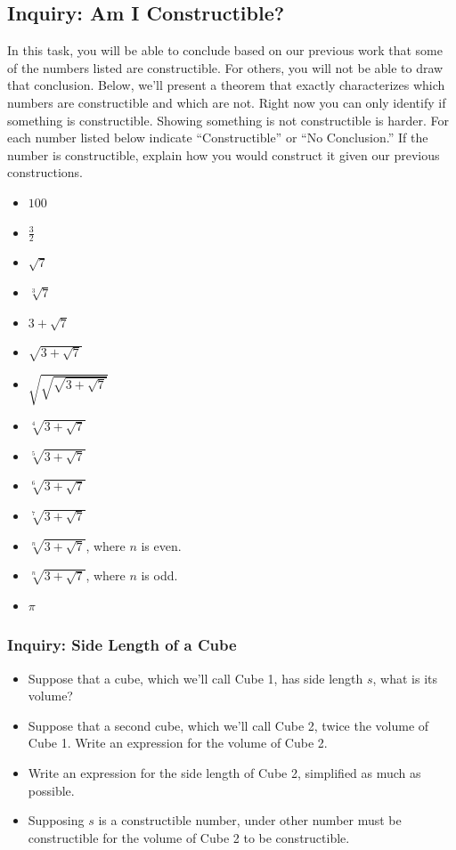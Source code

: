 \documentclass[11pt]{article}
\newenvironment{task}
	{\begin{mdframed}[linecolor=lightgray, linewidth=3pt]\raggedright}
	{\end{mdframed}}
\theoremstyle{definition}
\begin{document}
\subsection{Inquiry: Am I Constructible?}
\begin{task}
  In this task, you will be able to conclude based on our previous work that some of the numbers listed are constructible. For others, you will not 
  be able to draw that conclusion. Below, we'll present a theorem that exactly characterizes which numbers are constructible and which are not. Right now
  you can only identify if something is constructible. Showing something is not constructible is harder. For each number listed below indicate ``Constructible''
  or ``No Conclusion.'' If the number is constructible, explain how you would construct it given our previous constructions.
  \begin{itemize}
    \item $100$
    \item $\frac{3}{2}$
    \item $\sqrt{7}$
    \item $\sqrt[3]{7}$
    \item $3 + \sqrt{7}$
    \item $\sqrt{3 + \sqrt{7}}$
    \item $\sqrt{\sqrt{\sqrt{3+\sqrt{7}}}}$
    \item $\sqrt[4]{3 + \sqrt{7}}$
    \item $\sqrt[5]{3 + \sqrt{7}}$
    \item $\sqrt[6]{3 + \sqrt{7}}$
    \item $\sqrt[7]{3 + \sqrt{7}}$
    \item $\sqrt[n]{3 + \sqrt{7}}$, where $n$ is even.
    \item $\sqrt[n]{3 + \sqrt{7}}$, where $n$ is odd.
    \item $\pi$
  \end{itemize}
\end{task}\newpage

\subsubsection{Inquiry: Side Length of a Cube}
\begin{task}
  \begin{itemize}
    \item Suppose that a cube, which we'll call Cube 1, has side length $s$, what is its volume?
    \item Suppose that a second cube, which we'll call Cube 2, twice the volume of Cube 1. Write an expression for the volume of Cube 2.
    \item Write an expression for the side length of Cube 2, simplified as much as possible.
    \item Supposing $s$ is a constructible number, under other number must be constructible for the volume of Cube 2 to be constructible.
  \end{itemize}
  
\end{task}\newpage
\end{document}

